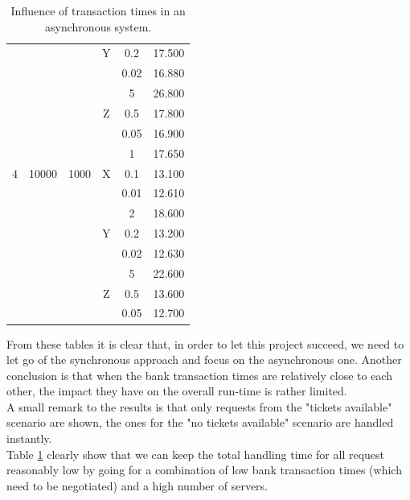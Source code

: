\documentclass[conference]{IEEEtran}
\begin{document}
\begin{table}[!t]
{\begin{tabular}{c|c|c|c|c|c}
			&	 								& 								  & Y				   & 0.2 					   & 17.500\\
			&									& 								  &						& 0.02 					   & 16.880 \\\hline
			&									& 								  &				   		& 5 						 & 26.800 \\
			&	 								& 								  & Z				   & 0.5 					   & 17.800\\
			&									& 								  &						& 0.05 					   & 16.900\\\hline
			&  					  			&  								  & 					& 1 						 & 17.650 \\
			4								&	10000 					  & 1000						& X					 & 0.1 						 & 13.100 \\
			&									& 								  &						& 0.01 					   & 12.610 \\\hline
			&									& 								  &				   		& 2 						 & 18.600 \\
			&	 								& 								  & Y				   & 0.2 					   & 13.200\\
			&									& 								  &						& 0.02 					   & 12.630 \\\hline
			&									& 								  &				   		& 5 						 & 22.600 \\
			&	 								& 								  & Z				   & 0.5 					   & 13.600\\
			&									& 								  &						& 0.05 					   & 12.700\\
	\end{tabular}}
	\caption{\label{tab:banking-time-influence-asynchronous}Influence of transaction times in an asynchronous system.}
\end{table}\noindent
From these tables it is clear that, in order to let this project succeed, we need to let go of the synchronous approach and focus on the asynchronous one. Another conclusion is that when the bank transaction times are relatively close to each other, the impact they have on the overall run-time is rather limited.\\
A small remark to the results is that only requests from the "tickets available" scenario are shown, the ones for the "no tickets available" scenario are handled instantly.\\
Table \ref{tab:banking-time-influence-asynchronous} clearly show that we can keep the total handling time for all request reasonably low by going for a combination of low bank transaction times (which need to be negotiated) and a high number of servers.
\end{document}
